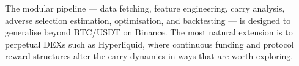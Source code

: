 \documentclass[11pt,a4paper]{article}
\begin{document}
The modular pipeline --- data fetching, feature engineering, carry analysis, 
adverse selection estimation, optimisation, and backtesting --- is designed 
to generalise beyond BTC/USDT on Binance. The most natural extension is to 
perpetual DEXs such as Hyperliquid, where continuous funding and protocol 
reward structures alter the carry dynamics in ways that are worth exploring.
\end{document}
